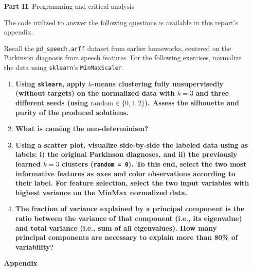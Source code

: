 \documentclass[12pt]{article}
\begin{document}
\pagebreak

\center\large{\textbf{Part II}: Programming and critical analysis}

\begin{justify}
  The code utilized to answer the following questions is available in this
  report's appendix.
\end{justify}

Recall the \texttt{pd\_speech.arff} dataset from earlier homeworks, centered on
the Parkinson diagnosis from speech features. For the following exercises, normalize
the data using \texttt{sklearn}'s \texttt{MinMaxScaler}.

\begin{enumerate}[leftmargin=\labelsep,resume]

  \item \textbf{Using \texttt{sklearn}, apply $k$-means clustering fully unsupervisedly
          (without targets) on the normalized data with $k = 3$ and three different seeds
          (using $\text{random} \in \{0, 1, 2\}$). Assess the silhouette and purity of the produced solutions.}

  \item \textbf{What is causing the non-determinism?}

  \item \textbf{Using a scatter plot, visualize side-by-side the labeled data using as labels: i) the original
          Parkinson diagnoses, and ii) the previously learned $k = 3$ clusters (\texttt{random = 0}). To this end, select
          the two most informative features as axes and color observations according to their label. For feature
          selection, select the two input variables with highest variance on the MinMax normalized data.}

  \item \textbf{The fraction of variance explained by a principal component is the ratio between the
          variance of that component (i.e., its eigenvalue) and total variance (i.e., sum of all eigenvalues).
          How many principal components are necessary to explain more than 80\% of variability?}

\end{enumerate}

\pagebreak

\large{\textbf{Appendix}\vskip 0.3cm}


\end{document}
